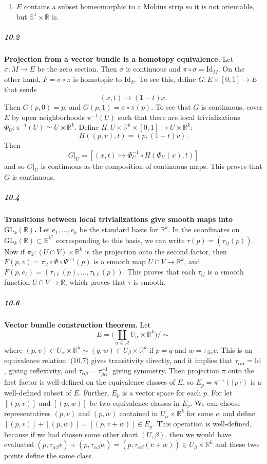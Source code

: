 \documentclass[10pt,letter]{article}
\begin{document}
\begin{enumerate}[label=(\alph*)]
\item $E$ contains a subset homeomorphic to a Mobius strip so it is not orientable, but $\mathbb{S}^1 \times \mathbb{R}$ is.
\end{enumerate}
\subparagraph{10.2} {\bf Projection from a vector bundle is a homotopy equivalence.} Let $\sigma: M \rightarrow E$ be the zero section. Then $\sigma$ is continuous and $\pi \circ \sigma = \text{Id}_M$. On the other hand, $F = \sigma \circ \pi$ is homotopic to $\text{Id}_E$. To see this, define $G: E \times [0,1] \rightarrow E$ that sends
\[ (x,t) \mapsto (1-t)x. \] Then $G(p,0) = p$, and $G(p,1) = \sigma \circ \pi(p)$. To see that $G$ is continuous, cover $E$ by open neighborhoods $\pi^{-1}(U)$ such that there are local trivializations $\Phi_U: \pi^{-1}(U) \simeq U \times \mathbb{R}^k$. Define $H: U \times \mathbb{R}^k  \times [0,1] \rightarrow U \times \mathbb{R}^k$: \[ H((p,v),t) = (p,(1-t)v). \] Then \[ G\vert_U = [ (x,t) \mapsto  \Phi_U^{-1} \circ H(\Phi_U(x),t) ] \] and so $G\vert_U$ is continuous as the composition of continuous maps. This proves that $G$ is continuous. 

\subparagraph{10.4} {\bf Transitions between local trivializations give smooth maps into $\text{GL}_k(\mathbb{R})$.} Let $e_1,...,e_k$ be the standard basis for $\mathbb{R}^k$. In the coordinates on $\text{GL}_k(\mathbb{R}) \subset \mathbb{R}^{k^2}$ corresponding to this basis, we can write $\tau(p) = (\tau_{ij}(p))$. Now if $\pi_2: (U \cap V) \times \mathbb{R}^k$ is the projection onto the second factor, then $F(p,v) = \pi_2 \circ \Phi \circ \Psi^{-1}(p)$ is a smooth map $U \cap V \rightarrow \mathbb{R}^k$, and $F(p,e_\ell) = (\tau_{1\ell}(p),...,\tau_{k\ell}(p))$. This proves that each $\tau_{ij}$ is a smooth function $U \cap V \rightarrow \mathbb{R}$, which proves that $\tau$ is smooth.  

\subparagraph{10.6} {\bf Vector bundle construction theorem.} Let \[ E = \bigg( \coprod_{\alpha \in \mathcal{A}} U_{\alpha} \times \mathbb{R}^k  \bigg) / \sim \]
where $(p,v) \in U_{\alpha} \times \mathbb{R}^k \sim (q,w) \in U_{\beta} \times \mathbb{R}^k$ if $p = q$ and $w = \tau_{\beta \alpha}v$. This is an equivalence relation: (10.7) gives transitivity directly, and it implies that $\tau_{\alpha \alpha} = \text{Id}$, giving reflexivity, and $\tau_{\alpha \beta} = \tau_{\beta \alpha}^{-1}$, giving symmetry. Then projection $\pi$ onto the first factor is well-defined on the equivalence classes of $E$, so $E_p = \pi^{-1}(\lbrace p \rbrace)$ is a well-defined subset of $E$. Further, $E_p$ is a vector space for each $p$. For let $[(p,v)]$ and $[(p,w)]$ be two equivalence classes in $E_p$. We can choose representatives $(p,v)$ and $(p,w)$ contained in $U_{\alpha} \times \mathbb{R}^k$ for some $\alpha$ and define $[(p,v)] + [(p,w)] = [(p,v+w)] \in E_p$. This operation is well-defined, because if we had chosen some other chart $(U,\beta)$, then we would have evaluated $(p,\tau_{\alpha \beta}v) + (p,\tau_{\alpha \beta}w) = (p,\tau_{\alpha \beta}(v+w)) \in U_{\beta} \times \mathbb{R}^k$ and these two points define the same class. 
\end{document}

